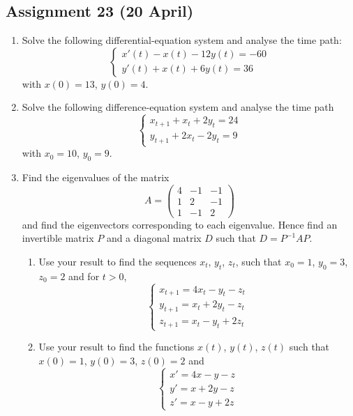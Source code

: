 \documentclass[a4paper]{article}
\begin{document}
\subsection*{Assignment 23 (20 April)}

\begin{enumerate}



\item Solve the following differential-equation system and analyse the time path:
\[
\begin{cases}
x'(t)-x(t)-12y(t)=-60 \\
y'(t)+x(t)+6y(t)=36
\end{cases}
\]
with $x(0)=13$, $y(0)=4$.

\item  Solve the following difference-equation system and analyse the time path
\[
\begin{cases}
x_{t+1}+x_t+2y_t=24 \\
y_{t+1}+2x_t-2y_t=9
\end{cases}
\]
 with $x_0=10$, $y_0=9$.

\item  Find the eigenvalues of the matrix 
\[
A=\begin{pmatrix}
4 & -1 & -1 \\ 
1 & 2 & -1 \\ 
1 & -1 & 2
\end{pmatrix} 
\]
and find the eigenvectors corresponding to each eigenvalue. Hence find an invertible matrix $P$  and a diagonal matrix $D$ such that $D=P^{-1}AP$. 

\begin{enumerate}
\item  Use your result to find the sequences $x_t$, $y_t$, $z_t$, such that $x_0=1$, $y_0=3$, $z_0=2$ and for $t>0$,
\[
\begin{cases}
x_{t+1}=4x_t-y_t-z_t \\
y_{t+1}=x_t+2y_t-z_t \\
z_{t+1}=x_t-y_t+2z_t
\end{cases}
\] 


\item Use your result to find the functions $x(t)$, $y(t)$, $z(t)$  such that  
$x(0)=1$, $y(0)=3$, $z(0)=2$ and 
\[
\begin{cases}
x'=4x-y-z \\
y'=x+2y-z \\
z'=x-y+2z
\end{cases}
\] 




\end{enumerate}
\end{enumerate}
\end{document}
